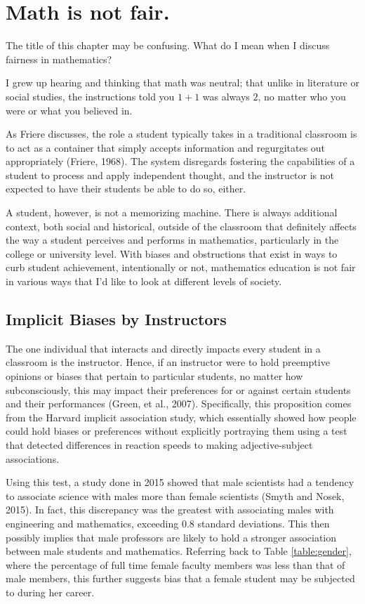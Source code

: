 \chapter{Math is not fair.}

The title of this chapter may be confusing. What do I mean when I discuss fairness in mathematics?

I grew up hearing and thinking that math was neutral; that unlike in literature or social studies, the instructions told you $1+1$ was always $2$, no matter who you were or what you believed in.

As Friere discusses, the role a student typically takes in a traditional classroom is to act as a container that simply accepts information and regurgitates out appropriately (Friere, 1968). The system disregards fostering the capabilities of a student to process and apply independent thought, and the instructor is not expected to have their students be able to do so, either.

A student, however, is not a memorizing machine. There is always additional context, both social and historical, outside of the classroom that definitely affects the way a student perceives and performs in mathematics, particularly in the college or university level. With biases and obstructions that exist in ways to curb student achievement, intentionally or not, mathematics education is not fair in various ways that I'd like to look at different levels of society.

\section{Implicit Biases by Instructors}
The one individual that interacts and directly impacts every student in a classroom is the instructor. Hence, if an instructor were to hold preemptive opinions or biases that pertain to particular students, no matter how subconsciously, this may impact their preferences for or against certain students and their performances (Green, et al., 2007). Specifically, this proposition comes from the Harvard implicit association study, which essentially showed how people could hold biases or preferences without explicitly portraying them using a test that detected differences in reaction speeds to making adjective-subject associations.

Using this test, a study done in 2015 showed that male scientists had a tendency to associate science with males more than female scientists (Smyth and Nosek, 2015). In fact, this discrepancy was the greatest with associating males with engineering and mathematics, exceeding 0.8 standard deviations. This then possibly implies that male professors are likely to hold a stronger association between male students and mathematics. Referring back to Table \ref{table:gender}, where the percentage of full time female faculty members was less than that of male members, this further suggests bias that a female student may be subjected to during her career.

